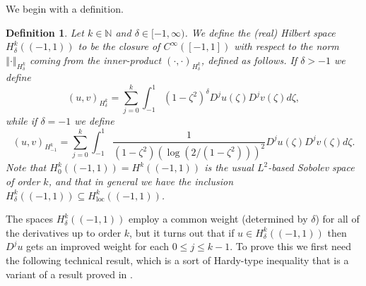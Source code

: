 \documentclass[11pt,reqno]{amsart}
\numberwithin{equation}{section}
\providecommand{\norm}[1]{\left\Vert#1\right\Vert}
\providecommand{\ip}[1]{\left(#1 \right)}
\providecommand{\norm}[1]{\left\Vert#1\right\Vert}
\newcommand{\m}{\mathrm}
\def\N{\mathbb{N}}
\newtheorem{dfn}[lem]{Definition}
\begin{document}
We begin with a definition.

\begin{dfn}
Let $k \in \N$ and $\delta \in [-1,\infty)$.  We define the (real) Hilbert space $H^k_{\delta}((-1,1))$ to be the closure of $C^\infty([-1,1])$ with respect to the norm $\norm{\cdot}_{H^k_\delta}$ coming from the inner-product $\ip{\cdot,\cdot}_{H^k_\delta}$, defined as follows.  If $\delta >-1$  we define 
\begin{equation}
 \ip{u,v}_{H^k_\delta} = \sum_{j=0}^k \int_{-1}^1 (1-\zeta^2)^\delta D^j u(\zeta) D^j v(\zeta)  d\zeta,
\end{equation}
while if $\delta=-1$ we define  
\begin{equation}
 \ip{u,v}_{H^k_{-1}} = \sum_{j=0}^k \int_{-1}^1  \frac{1}{(1-\zeta^2) (\log(2/(1-\zeta^2)))^2}  D^j u(\zeta) D^j v(\zeta) d\zeta.
\end{equation}
Note that $H^k_0((-1,1)) = H^k((-1,1))$ is the usual $L^2$-based Sobolev space of order $k$, and that in general we have the inclusion $H^k_\delta((-1,1)) \subseteq H^k_{\m{loc}}((-1,1))$. 
\end{dfn}



The spaces $H^k_\delta((-1,1))$ employ a common weight (determined by $\delta$) for all of the derivatives up to order $k$, but it turns out that if $u \in H^k_\delta((-1,1))$ then $D^j u$ gets an improved weight for each $0 \le j \le k-1$.  To prove this we first need the following technical result, which is a sort of Hardy-type inequality that is a variant of a result proved in \cite{KK_1967}.   
\end{document}
